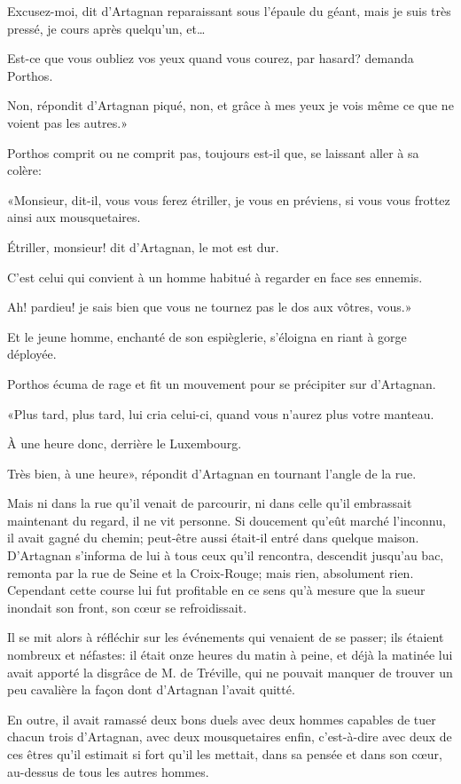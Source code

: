 \speak  Excusez-moi, dit d'Artagnan reparaissant sous l'épaule du géant, mais je suis très pressé, je cours après quelqu'un, et\dots 

\speak  Est-ce que vous oubliez vos yeux quand vous courez, par hasard? demanda Porthos. 

\speak  Non, répondit d'Artagnan piqué, non, et grâce à mes yeux je vois même ce que ne voient pas les autres.» 

Porthos comprit ou ne comprit pas, toujours est-il que, se laissant aller à sa colère: 

«Monsieur, dit-il, vous vous ferez étriller, je vous en préviens, si vous vous frottez ainsi aux mousquetaires. 

\speak  Étriller, monsieur! dit d'Artagnan, le mot est dur. 

\speak  C'est celui qui convient à un homme habitué à regarder en face ses ennemis. 

\speak  Ah! pardieu! je sais bien que vous ne tournez pas le dos aux vôtres, vous.» 

Et le jeune homme, enchanté de son espièglerie, s'éloigna en riant à gorge déployée. 

Porthos écuma de rage et fit un mouvement pour se précipiter sur d'Artagnan. 

«Plus tard, plus tard, lui cria celui-ci, quand vous n'aurez plus votre manteau. 

\speak  À une heure donc, derrière le Luxembourg. 

\speak  Très bien, à une heure», répondit d'Artagnan en tournant l'angle de la rue. 

Mais ni dans la rue qu'il venait de parcourir, ni dans celle qu'il embrassait maintenant du regard, il ne vit personne. Si doucement qu'eût marché l'inconnu, il avait gagné du chemin; peut-être aussi était-il entré dans quelque maison. D'Artagnan s'informa de lui à tous ceux qu'il rencontra, descendit jusqu'au bac, remonta par la rue de Seine et la Croix-Rouge; mais rien, absolument rien. Cependant cette course lui fut profitable en ce sens qu'à mesure que la sueur inondait son front, son cœur se refroidissait. 

Il se mit alors à réfléchir sur les événements qui venaient de se passer; ils étaient nombreux et néfastes: il était onze heures du matin à peine, et déjà la matinée lui avait apporté la disgrâce de M. de Tréville, qui ne pouvait manquer de trouver un peu cavalière la façon dont d'Artagnan l'avait quitté. 

En outre, il avait ramassé deux bons duels avec deux hommes capables de tuer chacun trois d'Artagnan, avec deux mousquetaires enfin, c'est-à-dire avec deux de ces êtres qu'il estimait si fort qu'il les mettait, dans sa pensée et dans son cœur, au-dessus de tous les autres hommes. 

